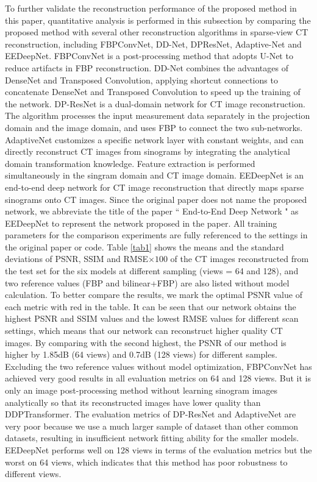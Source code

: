 \documentclass[lettersize,journal]{IEEEtran}
\begin{document}
To further validate the reconstruction performance of the proposed method in this paper, quantitative analysis is performed in this subsection by comparing the proposed method
with several other reconstruction algorithms in sparse-view CT
reconstruction, including FBPConvNet\cite{2016FBPConvNet}, DD-Net\cite{2018DDNet}, DPResNet\cite{2019DP-ResNet}, Adaptive-Net\cite{2020ADAPTIVE} and EEDeepNet\cite{2020An}. FBPConvNet is a post-processing method that adopts U-Net\cite{2015Unet} to reduce artifacts in FBP reconstruction. DD-Net combines the advantages of DenseNet and Transposed Convolution, applying shortcut connections to concatenate DenseNet and Transposed Convolution to speed up the training of the network. DP-ResNet is a dual-domain network for CT image reconstruction. The algorithm processes the input measurement data separately in the projection domain and the image domain, and uses FBP to connect the two sub-networks. AdaptiveNet customizes a specific network layer with constant weights, and can directly reconstruct CT images from sinograms by integrating the analytical domain transformation knowledge. Feature extraction is performed simultaneously in the singram domain and CT image domain. EEDeepNet is an end-to-end deep network for CT image reconstruction that directly maps sparse sinograms onto CT images. Since the original paper does not name the proposed network, we abbreviate the title of the paper `` End-to-End Deep Network " as EEDeepNet to represent the network proposed in the paper. All training parameters for the comparison experiments are fully referenced to the settings in the original paper or code. Table \ref{tab1} shows the means and the standard deviations of PSNR, SSIM and RMSE$\times100$ of the CT images reconstructed from the test set for the six models at different sampling (views = 64 and 128), and two reference values (FBP and bilinear+FBP) are also listed without model calculation. To better compare the results, we mark the optimal PSNR value of each metric with red in the table. It can be seen that our network obtains the highest PSNR and SSIM values and the lowest RMSE values for different scan settings, which means that our network can reconstruct higher quality CT images. By comparing with the second highest, the PSNR of our method is higher by 1.85dB (64 views) and 0.7dB (128 views) for different samples. Excluding the two reference values without model optimization, FBPConvNet has achieved very good results in all evaluation metrics on 64 and 128 views. But it is only an image post-processing method without learning sinogram images analytically so that its reconstructed images have lower quality than DDPTransformer. The evaluation metrics of DP-ResNet and AdaptiveNet are very poor because we use a much larger sample of dataset than other common datasets, resulting in insufficient network fitting ability for the smaller models. EEDeepNet performs well on 128 views in terms of the evaluation metrics but the worst on 64 views, which indicates that this method has poor robustness to different views.
\end{document}
